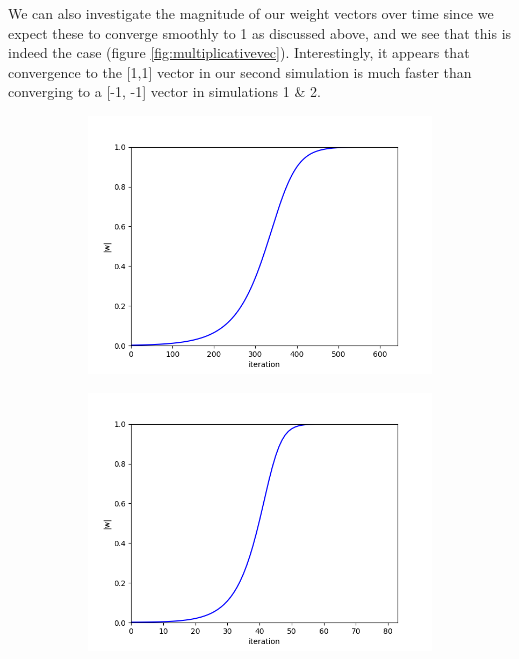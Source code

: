 \documentclass{article}
\begin{document}
We can also investigate the magnitude of our weight vectors over time since we expect these to converge smoothly to 1 as discussed above, and we see that this is indeed the case (figure \ref{fig:multiplicativevec}). Interestingly, it appears that convergence to the [1,1] vector in our second simulation is much faster than converging to a [-1, -1] vector in simulations 1 \& 2.

\begin{figure}[h]
	\centering
	\begin{subfigure}[t]{0.30\linewidth}
		\centering
		\includegraphics[width = 1.0\linewidth, trim={0 0 0 0}, clip=true]{figures/2d_sim1_vec.png}
		\subcaption{}
		\label{fig:sim1vec}	
	\end{subfigure}%
	\hspace{0.03\linewidth}
	\begin{subfigure}[t]{0.30\linewidth}
		\centering
		\includegraphics[width = 1.0\linewidth, trim={0 0 0 0}, clip=true]{figures/2d_sim2_vec.png}

\end{subfigure}
\end{figure}
\end{document}

